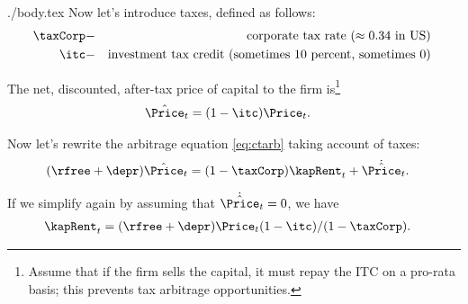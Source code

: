 \documentclass{handout}
\begin{document}
\begin{verbatimwrite}{./body.tex}
Now let's introduce taxes, defined as follows:
\begin{equation*}\begin{gathered}\begin{aligned}
        \taxCorp & - & \text{corporate tax rate ($\approx 0.34$ in US) }
\\      \itc & - & \text{investment tax credit (sometimes 10 percent, sometimes 0) }
\end{aligned}\end{gathered}\end{equation*}

The net, discounted, after-tax price of capital to the firm is\footnote{Assume that if the firm sells the capital, it must repay the ITC on a pro-rata basis; this prevents tax arbitrage opportunities.}
\begin{equation}\begin{gathered}\begin{aligned}
        \hat{\Price}_{t} & =  (1-\itc) \Price_{t}.
\end{aligned}\end{gathered}\end{equation}

Now let's rewrite the arbitrage equation \eqref{eq:ctarb} taking account of taxes: 
\begin{equation}\begin{gathered}\begin{aligned}
        (\rfree+\depr) \hat{\Price}_{t} & =  (1-\taxCorp) \kapRent_{t}+\dot{\hat{\Price}}_{t}.
\end{aligned}\end{gathered}\end{equation}

If we simplify again by assuming that $\dot{\hat{\Price}}_{t}=0$, we have
\begin{equation}\begin{gathered}\begin{aligned}
        \kapRent_{t} & =  (\rfree+\depr)\Price_{t}(1-\itc)/(1-\taxCorp)
.
\end{aligned}\end{gathered}\end{equation}


\end{verbatimwrite}
\end{document}
